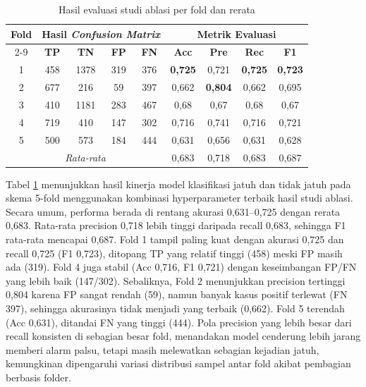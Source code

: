 \begin{table}[htbp]
    \centering
    \caption{Hasil evaluasi studi ablasi per fold dan rerata}
    \label{tab:evaluasi-fold-ablasi}
    \begin{tabular}{|c|c|c|c|c|c|c|c|c|}
        \hline
        \multirow{2}{*}{\textbf{Fold}} & \multicolumn{4}{c|}{\textbf{Hasil \textit{Confusion Matrix}}} & \multicolumn{4}{c|}{\textbf{Metrik Evaluasi}} \\ \cline{2-9}
         & \textbf{TP} & \textbf{TN} & \textbf{FP} & \textbf{FN} & \textbf{Acc} & \textbf{Pre} & \textbf{Rec} & \textbf{F1} \\ \hline
        1 & 458 & 1378 & 319 & 376 & \textbf{0,725} & 0,721 & \textbf{0,725} & \textbf{0,723} \\ \hline
        2 & 677 & 216 & 59 & 397 & 0,662 & \textbf{0,804} & 0,662 & 0,695 \\ \hline
        3 & 410 & 1181 & 283 & 467 & 0,68 & 0,67 & 0,68 & 0,67 \\ \hline
        4 & 719 & 410 & 147 & 302 & 0,716 & 0,741 & 0,716 & 0,721 \\ \hline
        5 & 500  & 573 & 184 & 444 & 0,631 & 0,656 & 0,631 & 0,628 \\ \hline
        \multicolumn{5}{|c|}{\textit{Rata-rata}} & 0,683 & 0,718 & 0,683 & 0,687 \\ \hline
    \end{tabular}
\end{table}

Tabel \ref{tab:evaluasi-fold-ablasi} menunjukkan hasil kinerja model klasifikasi jatuh dan tidak jatuh pada skema 5-fold menggunakan kombinasi hyperparameter terbaik hasil studi ablasi. Secara umum, performa berada di rentang akurasi 0,631–0,725 dengan rerata 0,683. Rata-rata precision 0,718 lebih tinggi daripada recall 0,683, sehingga F1 rata-rata mencapai 0,687. Fold 1 tampil paling kuat dengan akurasi 0,725 dan recall 0,725 (F1 0,723), ditopang TP yang relatif tinggi (458) meski FP masih ada (319). Fold 4 juga stabil (Acc 0,716, F1 0,721) dengan keseimbangan FP/FN yang lebih baik (147/302). Sebaliknya, Fold 2 menunjukkan precision tertinggi 0,804 karena FP sangat rendah (59), namun banyak kasus positif terlewat (FN 397), sehingga akurasinya tidak menjadi yang terbaik (0,662). Fold 5 terendah (Acc 0,631), ditandai FN yang tinggi (444). Pola precision yang lebih besar dari recall konsisten di sebagian besar fold, menandakan model cenderung lebih jarang memberi alarm palsu, tetapi masih melewatkan sebagian kejadian jatuh, kemungkinan dipengaruhi variasi distribusi sampel antar fold akibat pembagian berbasis folder. \par

